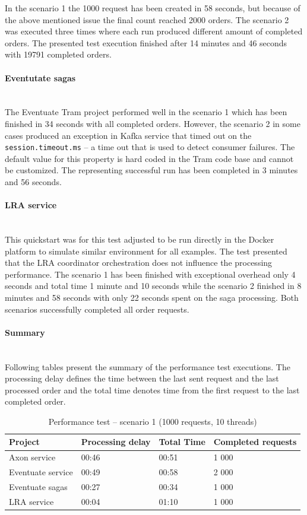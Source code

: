 \documentclass[oneside,
  digital, %
  table,   %
  nolof,     %
  nolot,     %
]{fithesis3}
\newcommand{\newlinepar}[1]{\paragraph{#1}\needspace{4\baselineskip}\mbox{}\\}
\begin{document}
In the scenario 1 the 1000 request has been created in 58 seconds, but because of the above mentioned issue the final count reached 2000 orders. The scenario 2 was executed three times where each run produced different amount of completed orders. The presented test execution finished after 14 minutes and 46 seconds with 19791 completed orders.

\newlinepar{Eventutate sagas}

The Eventuate Tram project performed well in the scenario 1 which has been finished in 34 seconds with all completed orders. However, the scenario 2 in some cases produced an exception in Kafka service that timed out on the \texttt{session.timeout.ms} -- a time out that is used to detect consumer failures. The default value for this property is hard coded in the Tram code base and cannot be customized. The representing successful run has been completed in 3 minutes and 56 seconds.

\newlinepar{LRA service}

This quickstart was for this test adjusted to be run directly in the Docker platform to simulate similar environment for all examples. The test presented that the LRA coordinator orchestration does not influence the processing performance. The scenario 1 has been finished with  exceptional overhead only 4 seconds and total time 1 minute and 10 seconds while the scenario 2 finished in 8 minutes and 58 seconds with only 22 seconds spent on the saga processing. Both scenarios successfully completed all order requests.

\newlinepar{Summary}

Following tables present the summary of the performance test executions. The processing delay defines the time between the last sent request and the last processed order and the total time denotes time from the first request to the last completed order.

\begin{table}[h]
    \begin{tabularx}{\textwidth}{lXXX}
        \toprule
        Project & Processing delay & Total Time & Completed requests \\
        \midrule
        Axon service & 00:46 & 00:51 & 1 000 \\
        Eventuate service & 00:49 & 00:58 & 2 000 \\
        Eventuate sagas & 00:27 & 00:34 & 1 000 \\
        LRA service & 00:04 & 01:10 & 1 000 \\
        \bottomrule
    \end{tabularx}
    \caption{Performance test -- scenario 1 (1000 requests, 10 threads)}
    \label{tab:performance-scenario-1}
\end{table}
\end{document}

